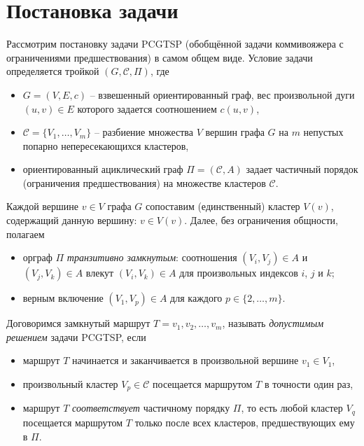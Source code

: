 
\section*{Постановка задачи}
\label{sec:pcgtsp-stmt}

Рассмотрим постановку задачи PCGTSP
(обобщённой задачи коммивояжера с ограничениями предшествования)
в самом общем виде.
Условие задачи определяется тройкой
$(G,\mathcal C,\Pi)$,
где
\begin{itemize}
  \item
	$G=(V,E,c)$
  -- взвешенный ориентированный граф,
  вес произвольной дуги $(u,v)\in E$
  которого задается соотношением
  $c(u,v)$,
  \item
	$\mathcal C=\{V_1,\ldots,V_m\}$
  -- разбиение множества $V$
  вершин графа $G$ на $m$
  непустых попарно непересекающихся кластеров,
  \item
	ориентированный ациклический граф
  $ \Pi = (\mathcal C, A) $
  задает частичный порядок
  (ограничения предшествования)
  на множестве кластеров
  $\mathcal C$.
\end{itemize}

Каждой вершине
$v\in V$
графа $G$
сопоставим
(единственный)
кластер
$V(v)$,
содержащий данную вершину:
$v\in V(v)$.
Далее, без ограничения общности, полагаем
\begin{itemize}
  \item
  орграф $\Pi$
  \textit{транзитивно замкнутым}:
  соотношения $(V_i,V_j)\in A$ и $(V_j,V_k)\in A$
  влекут $(V_i,V_k)\in A$
  для произвольных индексов $i$, $j$ и $k$;
  \item
  верным включение
  $(V_1,V_p)\in A$
  для каждого
  $p\in\{2,\ldots,m\}$.
\end{itemize}

Договоримся замкнутый маршрут
$T=v_1, v_2, \ldots, v_m$,
называть \textit{допустимым решением} задачи PCGTSP,
если
\begin{itemize}
  \item
  маршрут $T$ начинается и заканчивается в произвольной вершине
  $v_1\in V_1$,
  \item
  произвольный кластер
  $V_p\in\mathcal C$
  посещается маршрутом $T$ в точности один раз,
  \item
  маршрут $T$ \textit{соответствует} частичному порядку
  $\Pi$,
  то есть любой кластер $V_q$
  посещается маршрутом $T$
  только после всех кластеров,
  предшествующих ему в $\Pi$.
\end{itemize}

